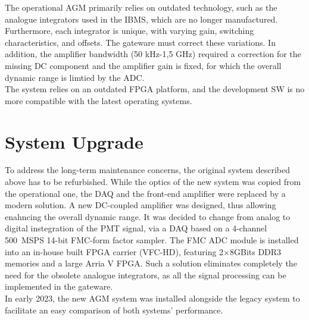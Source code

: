 The operational AGM primarily relies on outdated   technology, such as  the analogue integrators used in the IBMS,  which are no longer manufactured.
%
Furthermore, each integrator is unique, with varying gain, switching characteristics, and offsets. The gateware must correct these variations.
%
%
%
In addition, the amplifier bandwidth (50 kHz-1,5 GHz) %
required a correction for the missing DC component and the amplifier gain is fixed,  for which  the overall dynamic range is limtied by the ADC. 
%
\\
The system relies on an outdated FPGA platform, and the development SW is no more compatible with the latest operating systems. 

\section{System Upgrade}
To address the long-term maintenance concerns, the original system described above has to be refurbished. 
%
While the optics of the new system was copied from the operational one, the DAQ and the front-end amplifier were replaced by a modern solution.
%
A new DC-coupled amplifier was designed, thus allowing enahncing the overall dynamic range. 
%
It was decided to change from analog to digital instegration of the PMT signal, via a DAQ based on  a 4-channel \SI{500}{MSPS} 14-bit FMC-form factor sampler.
%
The FMC ADC module is installed into an in-house built FPGA carrier (VFC-HD), featuring 2$\times 8$GBits DDR3 memories and a large Arria V FPGA.
%
Such a solution eliminates completely the need for the obsolete analogue integrators, as all the signal processing can be implemented in the gateware.  
\\
In early 2023, the new AGM system was installed alongside the legacy system to facilitate an easy comparison of both systems' performance.

